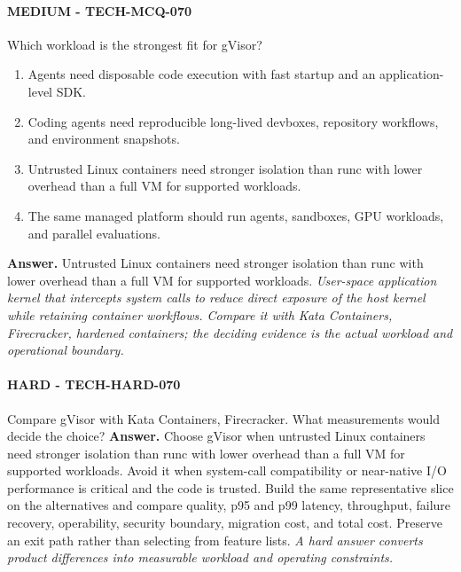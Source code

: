 \paragraph{MEDIUM - TECH-MCQ-070} Which workload is the strongest fit for gVisor?
\begin{enumerate}[label=\Alph*.]
\item Agents need disposable code execution with fast startup and an application-level SDK.
\item Coding agents need reproducible long-lived devboxes, repository workflows, and environment snapshots.
\item Untrusted Linux containers need stronger isolation than runc with lower overhead than a full VM for supported workloads.
\item The same managed platform should run agents, sandboxes, GPU workloads, and parallel evaluations.
\end{enumerate}
\textbf{Answer.} Untrusted Linux containers need stronger isolation than runc with lower overhead than a full VM for supported workloads.
\textit{User-space application kernel that intercepts system calls to reduce direct exposure of the host kernel while retaining container workflows. Compare it with Kata Containers, Firecracker, hardened containers; the deciding evidence is the actual workload and operational boundary.}
\paragraph{HARD - TECH-HARD-070} Compare gVisor with Kata Containers, Firecracker. What measurements would decide the choice?
\textbf{Answer.} Choose gVisor when untrusted Linux containers need stronger isolation than runc with lower overhead than a full VM for supported workloads. Avoid it when system-call compatibility or near-native I/O performance is critical and the code is trusted. Build the same representative slice on the alternatives and compare quality, p95 and p99 latency, throughput, failure recovery, operability, security boundary, migration cost, and total cost. Preserve an exit path rather than selecting from feature lists.
\textit{A hard answer converts product differences into measurable workload and operating constraints.}
